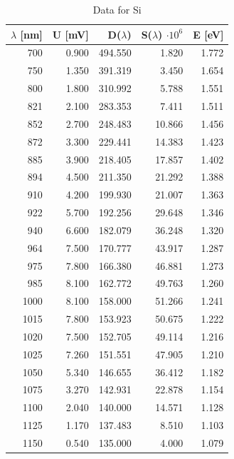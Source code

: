 \documentclass[english,11pt,a4paper]{article}
\begin{document}
\begin{multicols}{2}
		\begin{table}[H]
			\begin{tabular}{rr|rrr}
				\hline
				$\lambda$ [nm] & U [mV] & D($\lambda$) & S($\lambda$) $\cdot 10^6$& E [eV] \\
				\hline
				700 & 0.900 & 494.550 & 1.820 & 1.772 \\
				750 & 1.350 & 391.319 & 3.450 & 1.654 \\
				800 & 1.800 & 310.992 & 5.788 & 1.551 \\
				821 & 2.100 & 283.353 & 7.411 & 1.511 \\
				852 & 2.700 & 248.483 & 10.866 & 1.456 \\
				872 & 3.300 & 229.441 & 14.383 & 1.423 \\
				885 & 3.900 & 218.405 & 17.857 & 1.402 \\
				894 & 4.500 & 211.350 & 21.292 & 1.388 \\
				910 & 4.200 & 199.930 & 21.007 & 1.363 \\
				922 & 5.700 & 192.256 & 29.648 & 1.346 \\
				940 & 6.600 & 182.079 & 36.248 & 1.320 \\
				964 & 7.500 & 170.777 & 43.917 & 1.287 \\
				975 & 7.800 & 166.380 & 46.881 & 1.273 \\
				985 & 8.100 & 162.772 & 49.763 & 1.260 \\
				1000 & 8.100 & 158.000 & 51.266 & 1.241 \\
				1015 & 7.800 & 153.923 & 50.675 & 1.222 \\
				1020 & 7.500 & 152.705 & 49.114 & 1.216 \\
				1025 & 7.260 & 151.551 & 47.905 & 1.210 \\
				1050 & 5.340 & 146.655 & 36.412 & 1.182 \\
				1075 & 3.270 & 142.931 & 22.878 & 1.154 \\
				1100 & 2.040 & 140.000 & 14.571 & 1.128 \\
				1125 & 1.170 & 137.483 & 8.510 & 1.103 \\
				1150 & 0.540 & 135.000 & 4.000 & 1.079 \\
				
			\end{tabular}
			\caption{Data for Si}
\end{table}


		
	\end{multicols}
	\printbibliography
		
		
\end{document}
